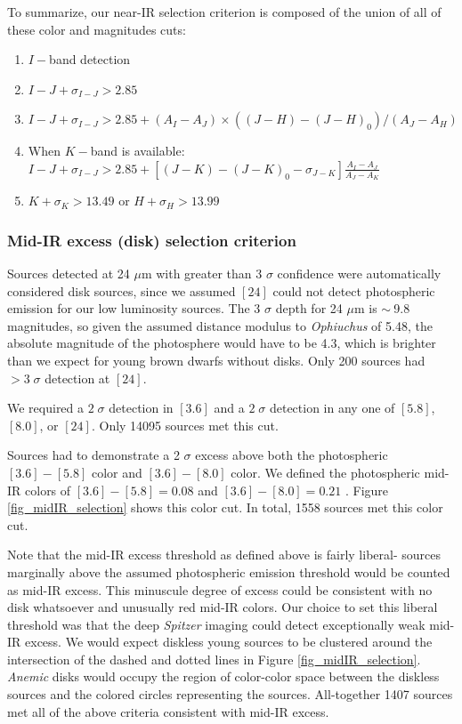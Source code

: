 \documentclass[12pt,preprint]{aastex}
\begin{document}
To summarize, our near-IR selection criterion is composed of the union of all of these color and magnitudes cuts:
\begin{enumerate}
\item $I-$band detection
\item $I-J +\sigma_{I-J} > 2.85$
\item $I-J +\sigma_{I-J} > 2.85 + (A_I-A_J)  \times ((J-H) - (J-H)_0)/ (A_J - A_H)$
\item When $K-$band is available: $I-J + \sigma_{I-J} > 2.85 + [(J-K) - (J-K)_0 - \sigma_{J-K}]\frac{A_I-A_J}{A_J - A_K}$ 
\item $K + \sigma_{K} > 13.49$ or  $H+\sigma_{H} > 13.99$
\end{enumerate}


\subsubsection{Mid-IR excess (disk) selection criterion}
\label{sec_midIR_selection}
Sources detected at 24 $\mu$m with greater than 3 $\sigma$ confidence were automatically considered disk sources, since we assumed $[24]$ could not detect photospheric emission for our low luminosity sources.  The 3 $\sigma$ depth for 24 $\mu$m is $\sim~$9.8 magnitudes, so given the assumed distance modulus to \emph{Ophiuchus} of 5.48, the absolute magnitude of the photosphere would have to be 4.3, which is brighter than we expect for young brown dwarfs without disks.  Only 200 sources had $>3\;\sigma$ detection at $[24]$.

We required a $2\;\sigma$ detection in $[3.6]$ and a $2\;\sigma$ detection in any one of $[5.8]$, $[8.0]$, or $[24]$.  Only 14095 sources met this cut.  

Sources had to demonstrate a 2 $\sigma$  excess above both the photospheric $[3.6]-[5.8]$ color and $[3.6]-[8.0]$ color.  We defined the photospheric mid-IR colors of $[3.6]-[5.8]=0.08$ and $[3.6]-[8.0]=0.21$ \citep{2006ApJ...651..502P}.  Figure \ref{fig_midIR_selection} shows this color cut.  In total, 1558 sources met this color cut.  

Note that the mid-IR excess threshold as defined above is fairly liberal- sources marginally above the assumed photospheric emission threshold would be counted as mid-IR excess.  This minuscule degree of excess could be consistent with no disk whatsoever and unusually red mid-IR colors.  Our choice to set this liberal threshold was that the deep \emph{Spitzer} imaging could detect exceptionally weak mid-IR excess.  We would expect diskless young sources to be clustered around the intersection of the dashed and dotted lines in Figure \ref{fig_midIR_selection}.  \emph{Anemic} disks would occupy the region of color-color space between the diskless sources and the colored circles representing the \citet{allers06} sources.  All-together 1407 sources met all of the above criteria consistent with mid-IR excess.
\end{document}

